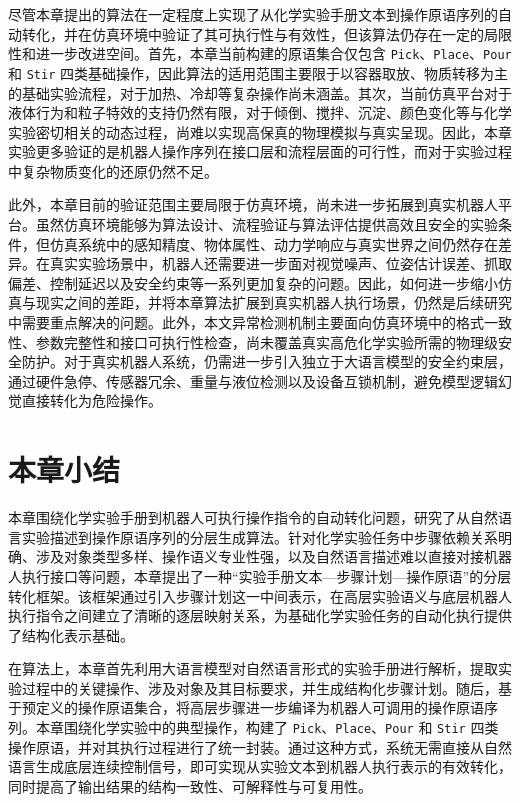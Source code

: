 尽管本章提出的算法在一定程度上实现了从化学实验手册文本到操作原语序列的自动转化，并在仿真环境中验证了其可执行性与有效性，但该算法仍存在一定的局限性和进一步改进空间。首先，本章当前构建的原语集合仅包含 \texttt{Pick}、\texttt{Place}、\texttt{Pour} 和 \texttt{Stir} 四类基础操作，因此算法的适用范围主要限于以容器取放、物质转移为主的基础实验流程，对于加热、冷却等复杂操作尚未涵盖。其次，当前仿真平台对于液体行为和粒子特效的支持仍然有限，对于倾倒、搅拌、沉淀、颜色变化等与化学实验密切相关的动态过程，尚难以实现高保真的物理模拟与真实呈现。因此，本章实验更多验证的是机器人操作序列在接口层和流程层面的可行性，而对于实验过程中复杂物质变化的还原仍然不足。


此外，本章目前的验证范围主要局限于仿真环境，尚未进一步拓展到真实机器人平台。虽然仿真环境能够为算法设计、流程验证与算法评估提供高效且安全的实验条件，但仿真系统中的感知精度、物体属性、动力学响应与真实世界之间仍然存在差异。在真实实验场景中，机器人还需要进一步面对视觉噪声、位姿估计误差、抓取偏差、控制延迟以及安全约束等一系列更加复杂的问题。因此，如何进一步缩小仿真与现实之间的差距，并将本章算法扩展到真实机器人执行场景，仍然是后续研究中需要重点解决的问题。此外，本文异常检测机制主要面向仿真环境中的格式一致性、参数完整性和接口可执行性检查，尚未覆盖真实高危化学实验所需的物理级安全防护。对于真实机器人系统，仍需进一步引入独立于大语言模型的安全约束层，通过硬件急停、传感器冗余、重量与液位检测以及设备互锁机制，避免模型逻辑幻觉直接转化为危险操作。


\section{本章小结}
\label{sec:ch5_summary}

本章围绕化学实验手册到机器人可执行操作指令的自动转化问题，研究了从自然语言实验描述到操作原语序列的分层生成算法。针对化学实验任务中步骤依赖关系明确、涉及对象类型多样、操作语义专业性强，以及自然语言描述难以直接对接机器人执行接口等问题，本章提出了一种“实验手册文本—步骤计划—操作原语”的分层转化框架。该框架通过引入步骤计划这一中间表示，在高层实验语义与底层机器人执行指令之间建立了清晰的逐层映射关系，为基础化学实验任务的自动化执行提供了结构化表示基础。

在算法上，本章首先利用大语言模型对自然语言形式的实验手册进行解析，提取实验过程中的关键操作、涉及对象及其目标要求，并生成结构化步骤计划。随后，基于预定义的操作原语集合，将高层步骤进一步编译为机器人可调用的操作原语序列。本章围绕化学实验中的典型操作，构建了 \texttt{Pick}、\texttt{Place}、\texttt{Pour} 和 \texttt{Stir} 四类操作原语，并对其执行过程进行了统一封装。通过这种方式，系统无需直接从自然语言生成底层连续控制信号，即可实现从实验文本到机器人执行表示的有效转化，同时提高了输出结果的结构一致性、可解释性与可复用性。

